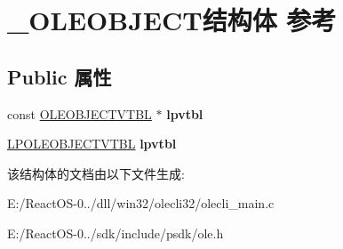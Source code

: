 \hypertarget{struct___o_l_e_o_b_j_e_c_t}{}\section{\+\_\+\+O\+L\+E\+O\+B\+J\+E\+C\+T结构体 参考}
\label{struct___o_l_e_o_b_j_e_c_t}
\subsection*{Public 属性}
\begin{DoxyCompactItemize}
\item 
\mbox{\label{struct___o_l_e_o_b_j_e_c_t_a88437eb0ea6de9d65cb52d5b3159c19c}} 
const \hyperlink{struct___o_l_e_o_b_j_e_c_t_v_t_b_l}{O\+L\+E\+O\+B\+J\+E\+C\+T\+V\+T\+BL} $\ast$ {\bfseries lpvtbl}
\item 
\mbox{\label{struct___o_l_e_o_b_j_e_c_t_a4f263965e6420b7b8b1bb2ca88e4edfa}} 
\hyperlink{struct___o_l_e_o_b_j_e_c_t_v_t_b_l}{L\+P\+O\+L\+E\+O\+B\+J\+E\+C\+T\+V\+T\+BL} {\bfseries lpvtbl}
\end{DoxyCompactItemize}


该结构体的文档由以下文件生成\+:\begin{DoxyCompactItemize}
\item 
E\+:/\+React\+O\+S-\/0../dll/win32/olecli32/olecli\+\_\+main.\+c\item 
E\+:/\+React\+O\+S-\/0../sdk/include/psdk/ole.\+h\end{DoxyCompactItemize}
